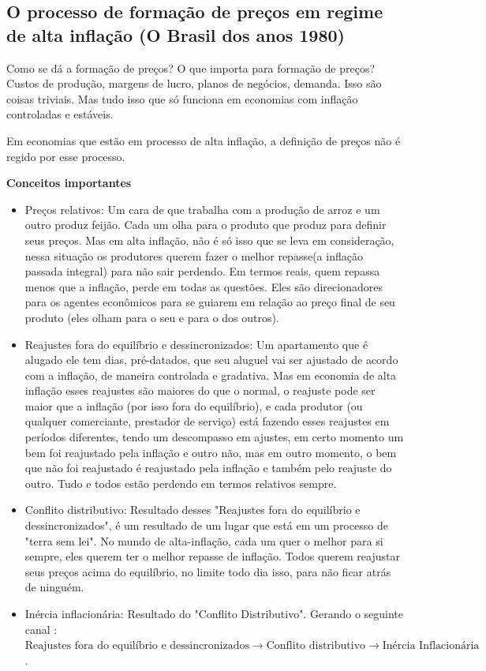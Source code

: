 \documentclass[a4paper,12pt]{article}[abntex2]
\begin{document}
\subsection{\textbf{O processo de formação de preços em regime de alta inflação (O Brasil dos anos 1980)}}
Como se dá a formação de preços? O que importa para formação de preços? Custos de produção, margens de lucro, planos de negócios, demanda. Isso são coisas triviais. Mas tudo isso que só funciona em economias com inflação controladas e estáveis. 

Em economias que estão em processo de alta inflação, a definição de preços não é regido por esse processo.

\textbf{Conceitos importantes}

\begin{itemize}
    \item Preços relativos: Um cara de que trabalha com a produção de arroz e um outro produz feijão. Cada um olha para o produto que produz para definir seus preços. Mas em alta inflação, não é só isso que se leva em consideração, nessa situação os produtores querem fazer o melhor repasse(a inflação passada integral) para não sair perdendo. Em termos reais, quem repassa menos que a inflação, perde em todas as questões. Eles são direcionadores para os agentes econômicos para se guiarem em relação ao preço final de seu produto (eles olham para o seu e para o dos outros).
    \item Reajustes fora do equilíbrio e dessincronizados: Um apartamento que é alugado ele tem dias, pré-datados, que seu aluguel vai ser ajustado de acordo com a inflação, de maneira controlada e gradativa. Mas em economia de alta inflação esses reajustes são maiores do que o normal, o reajuste pode ser maior que a inflação (por isso fora do equilíbrio), e cada produtor (ou qualquer comerciante, prestador de serviço) está fazendo esses reajustes em períodos diferentes, tendo um descompasso em ajustes, em certo momento um bem foi reajustado pela inflação e outro não, mas em outro momento, o bem que não foi reajustado é reajustado pela inflação e também pelo reajuste do outro. Tudo e todos estão perdendo em termos relativos sempre.  
    \item Conflito distributivo: Resultado desses "Reajustes fora do equilíbrio e dessincronizados", é um resultado de um lugar que está em um processo de "terra sem lei". No mundo de alta-inflação, cada um quer o melhor para si sempre, eles querem ter o melhor repasse de inflação. Todos querem reajustar seus preços acima do equilíbrio, no limite todo dia isso, para não ficar atrás de ninguém. 
    \item Inércia inflacionária: Resultado do "Conflito Distributivo". Gerando o seguinte canal : \(\text{Reajustes fora do equilíbrio e dessincronizados}\rightarrow \text{Conflito distributivo}\rightarrow\text{Inércia Inflacionária}\).
\end{itemize}
\end{document}

